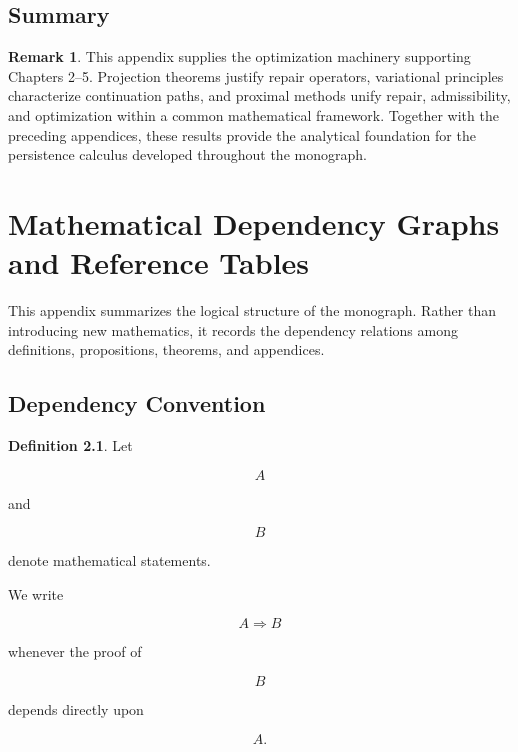 \documentclass[11pt]{book}
\numberwithin{equation}{chapter}
\theoremstyle{definition}
\newtheorem{definition}{Definition}[chapter]
\newtheorem{remark}[definition]{Remark}
\theoremstyle{plain}
\begin{document}

\section{Summary}

\begin{remark}

This appendix supplies the optimization machinery supporting Chapters
2--5. Projection theorems justify repair operators, variational
principles characterize continuation paths, and proximal methods unify
repair, admissibility, and optimization within a common mathematical
framework. Together with the preceding appendices, these results provide
the analytical foundation for the persistence calculus developed
throughout the monograph.

\end{remark}

\chapter{Mathematical Dependency Graphs and Reference Tables}

This appendix summarizes the logical structure of the monograph. Rather
than introducing new mathematics, it records the dependency relations
among definitions, propositions, theorems, and appendices.


\section{Dependency Convention}

\begin{definition}

Let

\[
A
\]

and

\[
B
\]

denote mathematical statements.

We write

\[
A\Longrightarrow B
\]

whenever the proof of

\[
B
\]

depends directly upon

\[
A.
\]

\end{definition}
\end{document}
